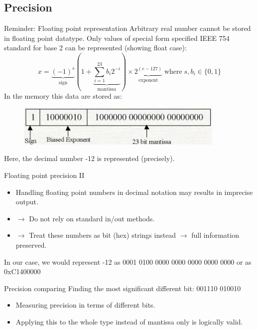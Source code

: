 \documentclass[compress,mathserif]{beamer}
\theoremstyle{definition}
\theoremstyle{plain}
\newcommand{\beI}{\begin{itemize}}
\newcommand{\enI}{\end{itemize}}
\begin{document}
\subsection{Precision}
    \begin{frame}{Reminder: Floating point representation}
        Arbitrary real number \alert{cannot} be stored in floating point datatype.
        Only values of special form specified IEEE 754 standard for base 2 can be represented (showing float case):
        \vspace{-6pt}
        \[
            x = \underbrace{(-1)^s}_{\mathrm{sign}}(1+\underbrace{\sum_{i=1}^{23}b_i2^{-i}}_{\mathrm{mantissa}})\times \underbrace{2^{(e-127)}}_{\mathrm{exponent}} \mathrm{\; where \;} s,b_i \in \{0,1\}
        \]
        In the memory this data are stored as:
        \vspace{-6pt}
        \begin{figure}
          \includegraphics[width = 100mm]{img/rep.png}
        \end{figure}
        \vspace{-6pt}
        Here, the decimal number -12 is represented (precisely).
    \end{frame}
    
    \begin{frame}{Floating point precision II}   
        \beI 
            \item Handling floating point numbers in decimal notation may results in imprecise output.
            \pause
            \item[$\rightarrow$] Do not rely on standard in/out methods.
            \pause
            \item[$\rightarrow$] Treat these numbers as bit (hex) strings instead 
                \newline $\rightarrow$ full information preserved.
        \enI
        \pause
        In our case, we would represent -12 as  0001 0100 0000 0000 0000 0000 0000 \newline or as 0xC1400000
    \end{frame}
    
    \begin{frame}{Precision comparing}
        Finding the most significant different bit: 001110 010010 \newline
        \beI
           \item<3-> Measuring precision in terms of different bits.
           \item<3-> Applying this to the whole type instead of mantissa only is logically valid.
        \enI
    \end{frame}
\end{document}
